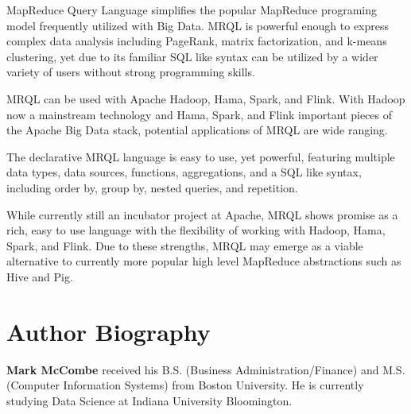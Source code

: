 \documentclass[9pt,twocolumn,twoside]{../../styles/osajnl}
\begin{document}
MapReduce Query Language simplifies the popular MapReduce programing model frequently utilized with Big Data.  MRQL is powerful enough to express complex data analysis including PageRank, matrix factorization, and k-means clustering, yet due to its familiar SQL like syntax can be utilized by a wider variety of users without strong programming skills.

MRQL can be used with Apache Hadoop, Hama, Spark, and Flink. With Hadoop now a mainstream technology and Hama, Spark, and Flink important pieces of the Apache Big Data stack, potential applications of MRQL are wide ranging.

The declarative MRQL language is easy to use, yet powerful, featuring multiple data types, data sources, functions, aggregations, and a SQL like syntax, including order by, group by, nested queries, and repetition. 

While currently still an incubator project at Apache, MRQL shows promise as a rich, easy to use language with the flexibility of working with Hadoop, Hama, Spark, and Flink.  Due to these strengths, MRQL may emerge as a viable alternative to currently more popular high level MapReduce abstractions such as Hive and Pig.




 
\section*{Author Biography}
\begingroup
\setlength\intextsep{0pt}
\begin{minipage}[t][3.2cm][t]{1.0\columnwidth} %
  \noindent
  {\bfseries Mark McCombe} received his B.S. (Business Administration/Finance) and M.S. (Computer Information Systems) from Boston University.  He is currently studying Data Science at Indiana University Bloomington.
\end{minipage}
\endgroup

\newpage

\appendix
\end{document}

